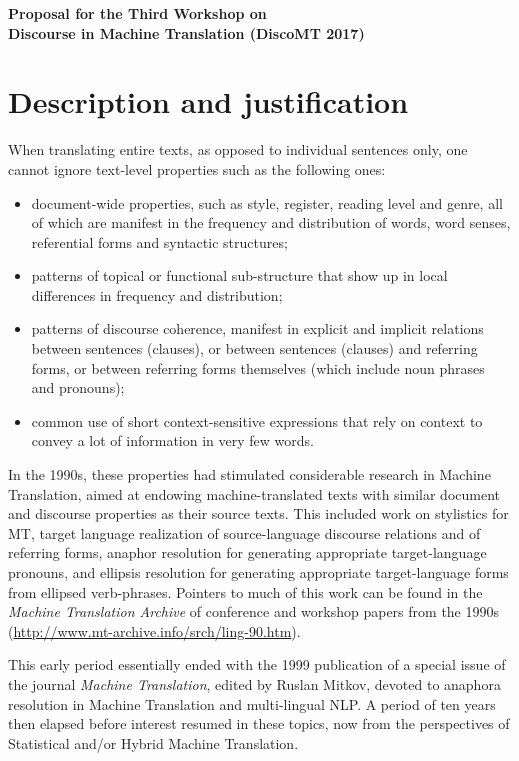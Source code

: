 \documentclass[11pt]{article}
\begin{document}
\begin{center}
\Large{\textbf{Proposal for the Third Workshop on\\
Discourse in Machine Translation (DiscoMT 2017)}}
\end{center}

\section{Description and justification}

When translating entire texts, as opposed to individual sentences only, 
one cannot ignore text-level properties such as the following ones:
\begin{itemize}
\item document-wide properties, such as style, register,
  reading level and genre, all of which are manifest in the frequency
  and distribution of words, word senses, referential forms and
  syntactic structures; 
\item patterns of topical or functional sub-structure that show up
   in local differences in frequency and distribution;
\item patterns of discourse coherence, manifest in explicit and
  implicit relations between sentences (clauses), or between
  sentences (clauses) and referring forms, or between referring forms
  themselves (which include noun phrases and pronouns);
\item common use of short context-sensitive expressions that rely on
  context to convey a lot of information in very few words.
\end{itemize}

In the 1990s, these properties had stimulated considerable research in
Machine Translation, aimed at endowing machine-translated texts with
similar document and discourse properties as their source texts.
This included work on stylistics for MT, target language realization of 
source-language discourse
relations and of referring forms, anaphor resolution for generating
appropriate target-language pronouns, and ellipsis
resolution for generating appropriate target-language forms from
ellipsed verb-phrases. Pointers to much of this work can
be found in the \textit{Machine Translation Archive} of conference
and workshop papers from the 1990s (\url{http://www.mt-archive.info/srch/ling-90.htm}).

This early period essentially ended with the 1999 publication of a special
issue of the journal \textit{Machine Translation}, edited by Ruslan Mitkov,
devoted to anaphora resolution in Machine Translation and multi-lingual NLP.
A period of ten years then elapsed before interest resumed in these topics,
now from the perspectives of Statistical and/or Hybrid Machine
Translation.  
\end{document}
